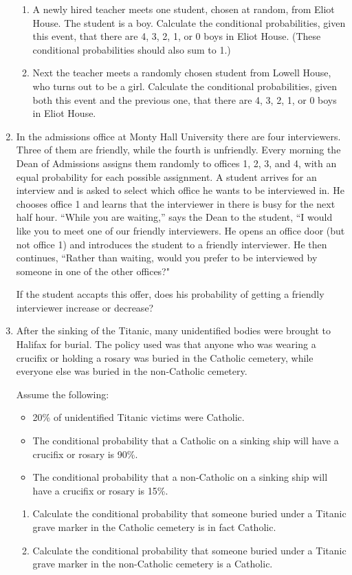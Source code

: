 \documentclass[12pt]{article}
\begin{document}
\begin{enumerate}
\begin{enumerate}
\item A newly hired teacher meets one student, chosen at random,
from Eliot House.  The student is a boy.  Calculate the
conditional probabilities, given this event, that there are 4, 3,
2, 1, or 0 boys in Eliot House. (These conditional probabilities
should also sum to 1.)

\item Next the teacher meets a randomly chosen student from Lowell
House, who turns out to be a girl. Calculate the conditional
probabilities, given both this event and the previous one, that
there are 4, 3, 2, 1, or 0 boys in Eliot House.
\end{enumerate}
\item   In the admissions office at Monty Hall University there
are four interviewers. Three of them are
friendly, while the fourth is unfriendly. Every morning the
Dean of Admissions assigns them randomly to offices 1, 2, 3, and
4, with an equal probability for each possible assignment. A
student arrives for an interview and is asked to select which
office he wants to be interviewed in. He chooses office 1 and
learns that the interviewer in there is busy for the next half
hour.
``While you are waiting,'' says the Dean to the student, ``I would like you to meet one of our friendly interviewers.  He opens an office door (but not office 1) and introduces the student to a friendly interviewer. He then continues, ``Rather than waiting, would you prefer to be interviewed by someone in one of the other offices?"

If the student accapts this offer, does his probability of getting a friendly interviewer increase or decrease?

\item After the sinking of the Titanic, many
unidentified bodies were brought to Halifax for burial. The policy used was that anyone who was wearing a crucifix or
holding a rosary was buried in the Catholic cemetery, while
everyone else was buried in the non-Catholic cemetery. 

Assume the following: \begin{itemize} \item 20\% of unidentified
Titanic victims were Catholic. \item The conditional probability
that a Catholic on a sinking ship will have a crucifix or rosary
is 90\%.
 \item The conditional probability that a non-Catholic on a sinking ship will have a crucifix or rosary is 15\%.
 
\end{itemize}
\begin{enumerate}
\item Calculate the conditional probability that someone buried under a Titanic grave marker in the Catholic cemetery is in fact Catholic. 

\item Calculate the conditional probability that someone buried under a Titanic grave marker in the non-Catholic cemetery is a Catholic.   \end{enumerate} 

\end{enumerate}
\end{document}
